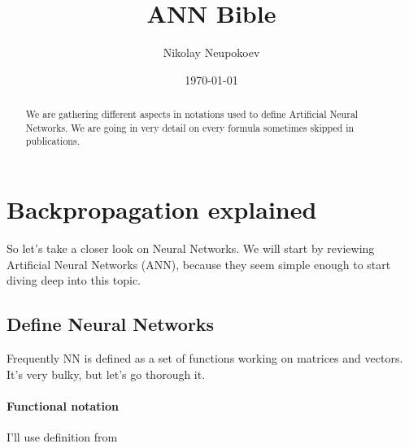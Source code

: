 \documentclass[draft]{article}
\title{ANN Bible}
\author{Nikolay Neupokoev}
\date{\today}
\begin{document}
\maketitle
\begin{abstract}
We are gathering different aspects in notations used to define Artificial Neural Networks. We are going in very detail on every formula sometimes skipped in publications.
\end{abstract}

\tableofcontents

\section{Backpropagation explained}


So let's take a closer look on Neural Networks. We will start by reviewing Artificial Neural Networks (ANN), because they seem simple enough to start diving deep into this topic.


\subsection{Define Neural Networks}

Frequently NN is defined as a set of functions working on matrices and vectors. It's very bulky, but let's go thorough it. 

\paragraph{Functional notation}
I'll use definition from \cite{Ostwald:2021}
\end{document}
